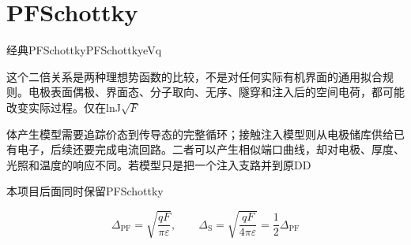 \section{PF\allowbreak{}Schottky\allowbreak{}}\label{sec:18}
{\cjkfont 经典}\allowbreak{}PF\allowbreak{}Schottky\allowbreak{}PF\allowbreak{}Schottky\allowbreak{}eV\allowbreak{}q\allowbreak{}
\par
{\cjkfont 这个二倍关系是两种理想势函数的比较，不是对任何实际有机界面的通用拟合规则。电极表面偶极、界面态、分子取向、无序、隧穿和注入后的空间电荷，都可能改变实际过程。仅在}\allowbreak{}lnJ\allowbreak{}\allowbreak{}\ensuremath{\sqrt{F}}\allowbreak{}
\par
{\cjkfont 体产生模型需要追踪价态到传导态的完整循环；接触注入模型则从电极储库供给已有电子，后续还要完成电流回路。二者可以产生相似端口曲线，却对电极、厚度、光照和温度的响应不同。若模型只是把一个注入支路并到原}\allowbreak{}DD\allowbreak{}
\par
{\cjkfont 本项目后面同时保留}\allowbreak{}PF\allowbreak{}Schottky\allowbreak{}
\par
\begin{equation}
\Delta_{\mathrm{PF}}=\sqrt{\frac{qF}{\pi\varepsilon}},\qquad \Delta_{\mathrm{S}}=\sqrt{\frac{qF}{4\pi\varepsilon}}=\frac{1}{2}\Delta_{\mathrm{PF}}
\label{eq:20}\end{equation}
